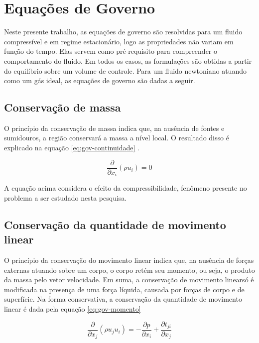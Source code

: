\section{Equações de Governo}

Neste presente trabalho, as equações de governo são resolvidas para um fluido compressível e em regime estacionário, logo as propriedades não variam em função do tempo. Elas servem como pré-requisito para compreender o comportamento do fluido. Em todos os casos, as formulações são obtidas a partir do equilíbrio sobre um volume de controle. Para um fluido newtoniano atuando como um gás ideal, as equações de governo são dadas a seguir.

\subsection{Conservação de massa}

O princípio da conservação de massa indica que, na ausência de fontes e sumidouros, a região conservará a massa a nível local. O resultado disso é explicado na equação \ref{eq:gov-continuidade} \cite{Moukalled2015, Wilcox2006}.

\begin{equation}
    \label{eq:gov-continuidade}
    \frac{\partial}{\partial x_i}(\rho u_i) = 0
\end{equation}

A equação acima considera o efeito da compressibilidade, fenômeno presente no problema a ser estudado nesta pesquisa.

\subsection{Conservação da quantidade de movimento linear}

O princípio da conservação do movimento linear indica que, na ausência de forças externas atuando sobre um corpo, o corpo retém seu momento, ou seja, o produto da massa pelo vetor velocidade. Em suma, a conservação de movimento linearsó é modificada na presença de uma força líquida, causada por forças de corpo e de superfície. Na forma conservativa, a conservação da quantidade de movimento linear é dada pela equação \ref{eq:gov-momento} \cite{Moukalled2015, Wilcox2006}

\begin{equation}
    \label{eq:gov-momento}
    \frac{\partial}{\partial x_j}(\rho u_j u_i) = -\frac{\partial p}{\partial x_i} + \frac{\partial t_{ji}}{\partial x_j}
\end{equation}

